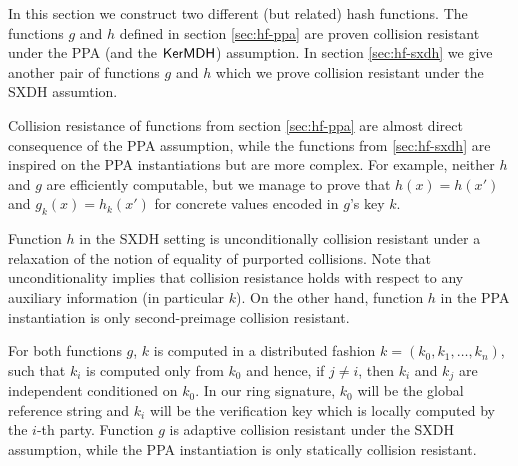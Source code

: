 
In this section we construct two different (but related) hash functions. The functions $g$ and $h$ defined in section \ref{sec:hf-ppa}  are proven collision resistant under the PPA (and the $\mathsf{KerMDH}$) assumption. In section \ref{sec:hf-sxdh} we give another pair of functions $g$ and $h$ which we prove collision resistant under the SXDH assumtion.

Collision resistance of functions from section \ref{sec:hf-ppa} are almost direct consequence of the PPA assumption, while the functions from \ref{sec:hf-sxdh} are inspired on the PPA instantiations but are more complex. For example, neither $h$ and $g$ are efficiently computable, but we manage to prove that $h(x)=h(x')$ and $g_k(x)=h_k(x')$ for concrete values encoded in $g$'s key $k$. 

Function $h$ in the SXDH setting is unconditionally collision resistant under a relaxation of the notion of equality of purported collisions. Note that unconditionality implies that collision resistance holds with respect to any auxiliary information (in particular $k$). On the other hand, function $h$ in the PPA instantiation is only second-preimage collision resistant.

For both functions $g$, $k$ is computed in a distributed fashion $k = (k_0,k_1,\ldots,k_n)$, such that $k_i$ is computed only from $k_0$ and hence, if $j\neq i$, then $k_i$ and $k_j$ are independent conditioned on $k_0$. In our ring signature, $k_0$ will be the global reference string and $k_i$ will be the verification key which is locally computed by the $i$-th party. 
Function $g$ is adaptive collision resistant under the SXDH assumption, while the PPA instantiation is only statically collision resistant.

